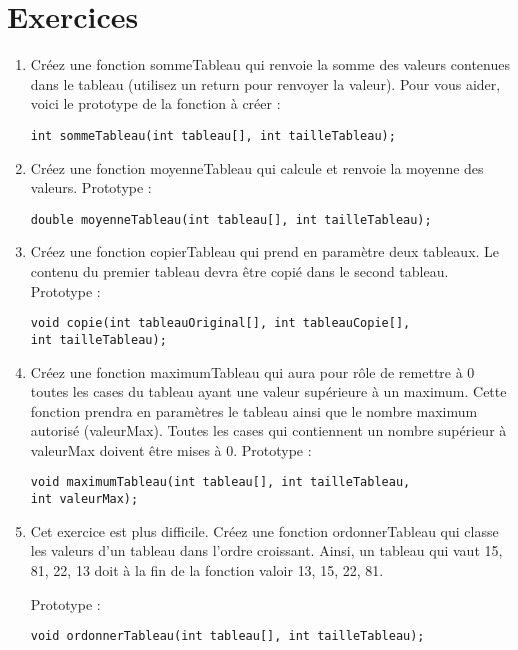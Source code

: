 \documentclass[a4paper, oneside,11pt]{book}
\begin{document}
\section{Exercices}
\begin{enumerate}
\item Cr\'eez une fonction sommeTableau qui renvoie la somme des valeurs contenues dans le tableau (utilisez un return pour renvoyer la valeur). Pour vous aider, 
voici le prototype de la fonction \`a cr\'eer :


\begin{lstlisting}
int sommeTableau(int tableau[], int tailleTableau);
\end{lstlisting} 


\item Cr\'eez une fonction moyenneTableau qui calcule et renvoie la moyenne des valeurs. Prototype :

\begin{lstlisting}
double moyenneTableau(int tableau[], int tailleTableau);
\end{lstlisting} 



\item Cr\'eez une fonction copierTableau qui prend en param\`etre deux tableaux. Le contenu du premier tableau devra \^etre copi\'e dans le second tableau.
Prototype :

\begin{lstlisting}
void copie(int tableauOriginal[], int tableauCopie[], 
int tailleTableau);
\end{lstlisting} 
\item Cr\'eez une fonction maximumTableau qui aura pour rôle de remettre \`a 0 toutes les cases du tableau ayant une valeur sup\'erieure \`a un maximum. Cette fonction prendra 
en param\`etres le tableau ainsi que le nombre maximum autoris\'e (valeurMax). Toutes les cases qui contiennent un nombre sup\'erieur \`a valeurMax doivent \^etre mises \`a 0. Prototype :

\begin{lstlisting}
void maximumTableau(int tableau[], int tailleTableau, 
int valeurMax);
\end{lstlisting} 

\item Cet exercice est plus difficile. Cr\'eez une fonction ordonnerTableau qui classe les valeurs d'un tableau dans l'ordre croissant. Ainsi, un tableau qui vaut 
{15, 81, 22, 13} doit \`a la fin de la fonction valoir {13, 15, 22, 81}.

Prototype :

\begin{lstlisting}
void ordonnerTableau(int tableau[], int tailleTableau);
\end{lstlisting} 

\end{enumerate}
\end{document}
